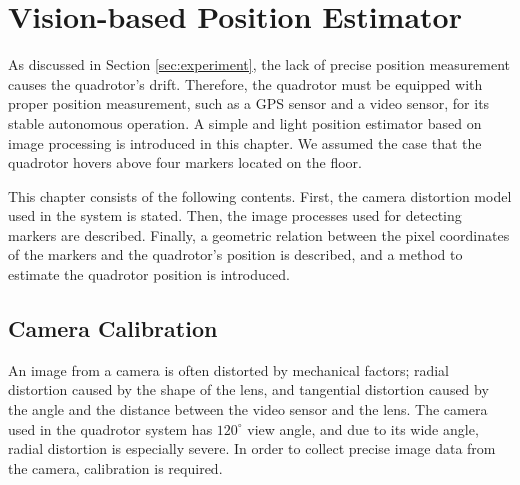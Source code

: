 \chapter{Vision-based Position Estimator}
\label{ch:vision_based_control}

As discussed in Section \ref{sec:experiment}, the lack of precise position measurement causes the quadrotor's drift. Therefore, the quadrotor must be equipped with proper position measurement, such as a GPS sensor and a video sensor, for its stable autonomous operation. A simple and light position estimator based on image processing is introduced in this chapter. We assumed the case that the quadrotor hovers above four markers located on the floor.

This chapter consists of the following contents. First, the camera distortion model used in the system is stated. Then, the image processes used for detecting markers are described. Finally, a geometric relation between the pixel coordinates of the markers and the quadrotor's position is described, and a method to estimate the quadrotor position is introduced.

\section{Camera Calibration}
An image from a camera is often distorted by mechanical factors; radial distortion caused by the shape of the lens, and tangential distortion caused by the angle and the distance between the video sensor and the lens. The camera used in the quadrotor system has \({120}^{\circ}\) view angle, and due to its wide angle, radial distortion is especially severe. In order to collect precise image data from the camera, calibration is required.

